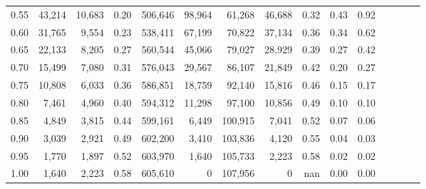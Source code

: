 \begin{tabular}{rrrcrrrrrrrrrrr}
0.55 &  43,214 &  10,683 &                                       0.20 &  506,646 &   98,964 &   61,268 &   46,688 &  0.32 &  0.43 &                         0.92 \\
0.60 &  31,765 &   9,554 &                                       0.23 &  538,411 &   67,199 &   70,822 &   37,134 &  0.36 &  0.34 &                         0.62 \\
0.65 &  22,133 &   8,205 &                                       0.27 &  560,544 &   45,066 &   79,027 &   28,929 &  0.39 &  0.27 &                         0.42 \\
0.70 &  15,499 &   7,080 &                                       0.31 &  576,043 &   29,567 &   86,107 &   21,849 &  0.42 &  0.20 &                         0.27 \\
0.75 &  10,808 &   6,033 &                                       0.36 &  586,851 &   18,759 &   92,140 &   15,816 &  0.46 &  0.15 &                         0.17 \\
0.80 &   7,461 &   4,960 &                                       0.40 &  594,312 &   11,298 &   97,100 &   10,856 &  0.49 &  0.10 &                         0.10 \\
0.85 &   4,849 &   3,815 &                                       0.44 &  599,161 &    6,449 &  100,915 &    7,041 &  0.52 &  0.07 &                         0.06 \\
0.90 &   3,039 &   2,921 &                                       0.49 &  602,200 &    3,410 &  103,836 &    4,120 &  0.55 &  0.04 &                         0.03 \\
0.95 &   1,770 &   1,897 &                                       0.52 &  603,970 &    1,640 &  105,733 &    2,223 &  0.58 &  0.02 &                         0.02 \\
1.00 &   1,640 &   2,223 &                                       0.58 &  605,610 &        0 &  107,956 &        0 &   nan &  0.00 &                         0.00 \\
\bottomrule
\end{tabular}
